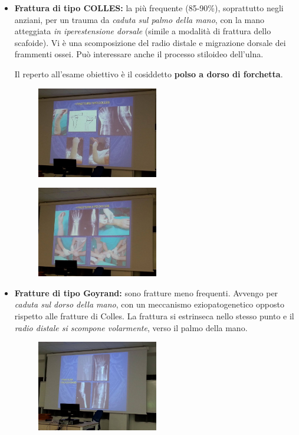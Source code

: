 \begin{itemize}
\item
  \textbf{Frattura di tipo COLLES:} la più frequente (85-90\%), soprattutto negli anziani, per un trauma da \emph{caduta sul palmo della mano}, con la mano atteggiata \emph{in iperestensione dorsale} (simile a modalità di frattura dello scafoide).
Vi è una scomposizione del radio distale e migrazione dorsale dei frammenti ossei. Può interessare anche il processo stiloideo dell'ulna.

Il reperto all'esame obiettivo è il cosiddetto \textbf{polso a dorso di forchetta}.

\begin{figure}[!ht]
\centering
\includegraphics[width=0.5\textwidth]{004/image8.jpeg}
\end{figure}

\begin{figure}[!ht]
\centering
\includegraphics[width=0.5\textwidth]{004/image9.jpeg}
\end{figure}

\item
  \textbf{Fratture di tipo Goyrand:} sono fratture meno frequenti. Avvengo per \emph{caduta sul dorso della mano}, con un meccanismo eziopatogenetico opposto rispetto alle fratture di Colles.
La frattura si estrinseca nello stesso punto e il \emph{radio distale si scompone volarmente}, verso il palmo della mano.

\begin{figure}[!ht]
\centering
\includegraphics[width=0.5\textwidth]{004/image10.jpeg}
\end{figure}

\end{itemize}

